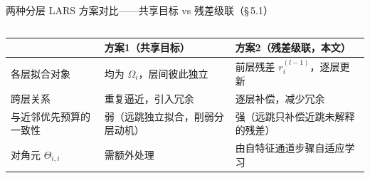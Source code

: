 \documentclass[aspectratio=169,9pt,xcolor=dvipsnames]{beamer}
\begin{document}
\begin{frame}{两种分层 LARS 方案对比——共享目标 vs 残差级联（§\,5.1）}
\begin{columns}[T]
\end{columns}

\vspace{0.1cm}
\small
\begin{tabular}{m{2.2cm}m{5.4cm}m{5.4cm}}
  \toprule
  & \textbf{方案1（共享目标）} & \textbf{方案2（残差级联，本文）} \\
  \midrule
  各层拟合对象 & 均为 $\Omega_i$，层间彼此独立 & 前层残差 $r_i^{(l-1)}$，逐层更新 \\
  跨层关系 & 重复逼近，引入冗余 & 逐层补偿，减少冗余 \\
  与近邻优先预算的一致性 & 弱（远跳独立拟合，削弱分层动机） & 强（远跳只补偿近跳未解释的残差） \\
  对角元 $\Theta_{i,i}$ & 需额外处理 & 由自特征通道步骤自适应学习 \\
  \bottomrule
\end{tabular}

\end{frame}
\end{document}

